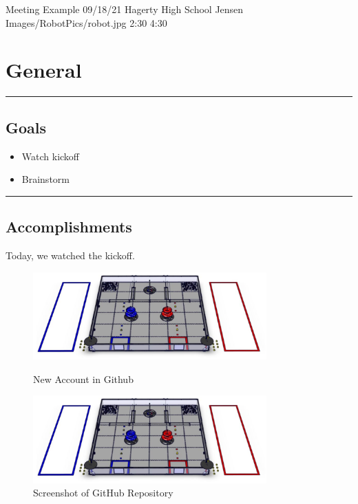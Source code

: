 \insertmeeting 
	{Meeting Example} 
	{09/18/21}
	{Hagerty High School}
	{Jensen}
	{Images/RobotPics/robot.jpg}
	{2:30}
  {4:30}
	
\section*{General}
\noindent\hfil\rule{\textwidth}{.4pt}\hfil
\subsection*{Goals}
\begin{itemize}
    \item Watch kickoff
    \item Brainstorm   

\end{itemize} 

\noindent\hfil\rule{\textwidth}{.4pt}\hfil

\subsection*{Accomplishments}
Today, we watched the kickoff.
 

\begin{figure}[ht]
\centering
\begin{minipage}[b]{.50\textwidth}
  \centering
  \includegraphics[width=0.8\textwidth]{Meetings/September/09-18-21/field.png}
  \caption{New Account in Github}
  \label{fig:pic1}
\end{minipage}%
\hfill%
\begin{minipage}[b]{.50\textwidth}
  \centering
  \includegraphics[width=0.8\textwidth]{Meetings/September/09-18-21/field.png}
  \caption{Screenshot of GitHub Repository}
  \label{fig:pic2}
\end{minipage}
\end{figure}







